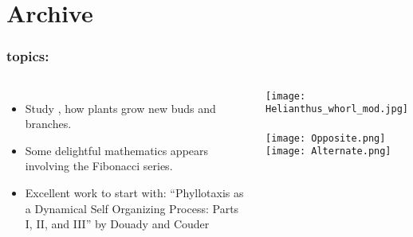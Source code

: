 



\section{Archive}

\begin{frame}
  \frametitle{topics:}

  \begin{block}{}
  \begin{columns}
    \begin{itemize}
    \item<1->
      Study , how plants grow new
      buds and branches.  
    \item<2->
      Some delightful mathematics appears involving
      the Fibonacci series.
    \item<3->
      Excellent work to start with:
      ``Phyllotaxis as a Dynamical Self Organizing Process: Parts I, II, and III''
      by Douady and Couder\cite{douady1996a,douady1996b,douady1996c}
    \end{itemize}
    \texttt{[image: Helianthus\_whorl\_mod.jpg]}\\
    {\tiny{}}\\
    \texttt{[image: Opposite.png]}
    \texttt{[image: Alternate.png]}\\
    {\tiny{}}
  \end{columns}
  \end{block}

\end{frame}
